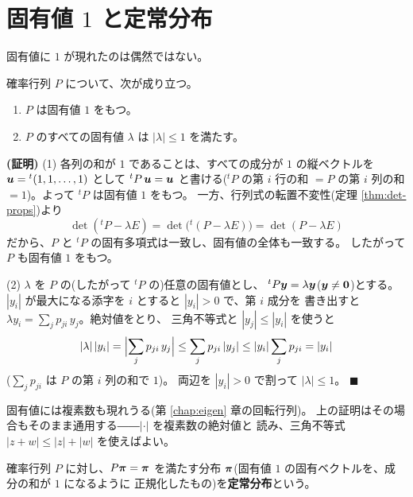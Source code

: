 \section{固有値 $1$ と定常分布}

固有値に $1$ が現れたのは偶然ではない。

\begin{teiri}[確率行列の固有値]\label{thm:markov-eigen}
確率行列 $P$ について、次が成り立つ。
\begin{enumerate}
\item $P$ は固有値 $1$ をもつ。
\item $P$ のすべての固有値 $\lambda$ は $|\lambda| \le 1$ を満たす。
\end{enumerate}
\end{teiri}

\noindent\textbf{(証明)}\quad
(1) 各列の和が $1$ であることは、すべての成分が $1$ の縦ベクトルを
$\bm{u} = {}^t(1, 1, \dots, 1)$ として
${}^tP\,\bm{u} = \bm{u}$ と書ける(${}^tP$ の第 $i$ 行の和
$= P$ の第 $i$ 列の和 $= 1$)。よって ${}^tP$ は固有値 $1$ をもつ。
一方、行列式の転置不変性(定理 \ref{thm:det-props})より
\[
\det({}^tP - \lambda E) = \det\bigl({}^t(P - \lambda E)\bigr)
= \det(P - \lambda E)
\]
だから、$P$ と ${}^tP$ の固有多項式は一致し、固有値の全体も一致する。
したがって $P$ も固有値 $1$ をもつ。

(2) $\lambda$ を $P$ の(したがって ${}^tP$ の)任意の固有値とし、
${}^tP\bm{y} = \lambda\bm{y}$($\bm{y} \neq \bm{0}$)とする。
$|y_i|$ が最大になる添字を $i$ とすると $|y_i| > 0$ で、第 $i$ 成分を
書き出すと $\lambda y_i = \sum_{j} p_{ji}\, y_j$。絶対値をとり、
三角不等式と $|y_j| \le |y_i|$ を使うと
\[
|\lambda|\,|y_i| = \Bigl|\sum_{j} p_{ji}\, y_j\Bigr|
\le \sum_{j} p_{ji}\,|y_j|
\le |y_i| \sum_{j} p_{ji} = |y_i|
\]
($\sum_j p_{ji}$ は $P$ の第 $i$ 列の和で $1$)。
両辺を $|y_i| > 0$ で割って $|\lambda| \le 1$。 $\blacksquare$

\begin{chui}
固有値には複素数も現れうる(第 \ref{chap:eigen} 章の回転行列)。
上の証明はその場合もそのまま通用する――$|\cdot|$ を複素数の絶対値と
読み、三角不等式 $|z + w| \le |z| + |w|$ を使えばよい。
\end{chui}

\begin{teigi}[定常分布]\label{def:markov-stat}
確率行列 $P$ に対し、$P\bm{\pi} = \bm{\pi}$ を満たす分布
$\bm{\pi}$(固有値 $1$ の固有ベクトルを、成分の和が $1$ になるように
正規化したもの)を\textbf{定常分布}という。
\end{teigi}

